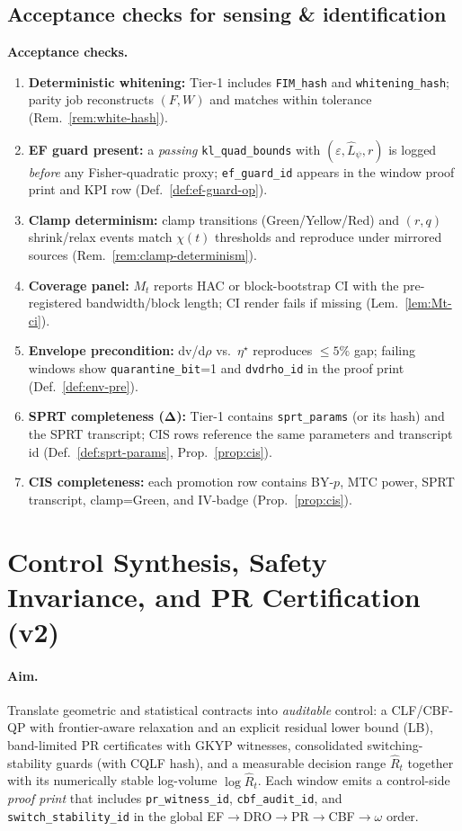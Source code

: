 \documentclass[10pt]{article}
\newcommand{\cutq}{q}
\newenvironment{acceptchecks}{\par\medskip\noindent\textbf{Acceptance checks.}\begin{enumerate}[leftmargin=*]}{\end{enumerate}\medskip}
\newenvironment{acceptchecks}{\begin{mdframed}\textbf{Acceptance checks.}\begin{enumerate}[leftmargin=*]}{\end{enumerate}\end{mdframed}}
\begin{document}
\subsection{Acceptance checks for sensing \& identification}\label{subsec:sense-accept}
\begin{acceptchecks}
\item \textbf{Deterministic whitening:} Tier-1 includes \texttt{FIM\_hash} and \texttt{whitening\_hash}; parity job reconstructs $(F,W)$ and matches within tolerance (Rem.~\ref{rem:white-hash}).
\item \textbf{EF guard present:} a \emph{passing} \texttt{kl\_quad\_bounds} with $(\varepsilon,\hat L_\psi,r)$ is logged \emph{before} any Fisher-quadratic proxy; \texttt{ef\_guard\_id} appears in the window proof print and KPI row (Def.~\ref{def:ef-guard-op}).
\item \textbf{Clamp determinism:} clamp transitions (Green/Yellow/Red) and $(r,\cutq)$ shrink/relax events match $\chi(t)$ thresholds and reproduce under mirrored sources (Rem.~\ref{rem:clamp-determinism}).
\item \textbf{Coverage panel:} $M_t$ reports HAC or block-bootstrap CI with the pre-registered bandwidth/block length; CI render fails if missing (Lem.~\ref{lem:Mt-ci}).
\item \textbf{Envelope precondition:} dv/d$\rho$ vs.\ $\eta^\star$ reproduces $\le 5\%$ gap; failing windows show \texttt{quarantine\_bit}=1 and \texttt{dvdrho\_id} in the proof print (Def.~\ref{def:env-pre}).
\item \textbf{SPRT completeness (Δ):} Tier-1 contains \texttt{sprt\_params} (or its hash) and the SPRT transcript; CIS rows reference the same parameters and transcript id (Def.~\ref{def:sprt-params}, Prop.~\ref{prop:cis}).
\item \textbf{CIS completeness:} each promotion row contains BY-$p$, MTC power, SPRT transcript, clamp=Green, and IV-badge (Prop.~\ref{prop:cis}).
\end{acceptchecks}


\section{Control Synthesis, Safety Invariance, and PR Certification (v2)}\label{sec:ctrl-v2}

\paragraph{Aim.}
Translate geometric and statistical contracts into \emph{auditable} control: a CLF/CBF-QP with frontier-aware relaxation and an explicit residual lower bound (LB), band-limited PR certificates with GKYP witnesses, consolidated switching-stability guards (with CQLF hash), and a measurable decision range $\hat R_t$ together with its numerically stable log-volume $\log \hat R_t$. Each window emits a control-side \emph{proof print} that includes \texttt{pr\_witness\_id}, \texttt{cbf\_audit\_id}, and \texttt{switch\_stability\_id} in the global EF$\rightarrow$DRO$\rightarrow$PR$\rightarrow$CBF$\rightarrow\omega$ order.
\end{document}
